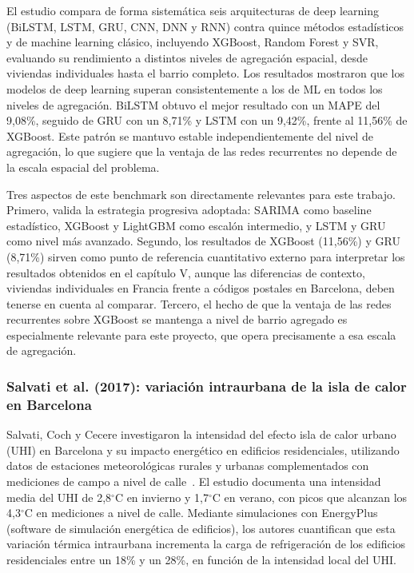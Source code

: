 \documentclass[12pt, a4paper]{article}
\begin{document}
El estudio compara de forma sistemática seis arquitecturas de deep learning (BiLSTM, LSTM, GRU, CNN, DNN y RNN) contra quince métodos estadísticos y de machine learning clásico, incluyendo XGBoost, Random Forest y SVR, evaluando su rendimiento a distintos niveles de agregación espacial, desde viviendas individuales hasta el barrio completo. Los resultados mostraron que los modelos de deep learning superan consistentemente a los de ML en todos los niveles de agregación. BiLSTM obtuvo el mejor resultado con un MAPE del 9,08\%, seguido de GRU con un 8,71\% y LSTM con un 9,42\%, frente al 11,56\% de XGBoost. Este patrón se mantuvo estable independientemente del nivel de agregación, lo que sugiere que la ventaja de las redes recurrentes no depende de la escala espacial del problema.

Tres aspectos de este benchmark son directamente relevantes para este trabajo. Primero, valida la estrategia progresiva adoptada: SARIMA como baseline estadístico, XGBoost y LightGBM como escalón intermedio, y LSTM y GRU como nivel más avanzado. Segundo, los resultados de XGBoost (11,56\%) y GRU (8,71\%) sirven como punto de referencia cuantitativo externo para interpretar los resultados obtenidos en el capítulo V, aunque las diferencias de contexto, viviendas individuales en Francia frente a códigos postales en Barcelona, deben tenerse en cuenta al comparar. Tercero, el hecho de que la ventaja de las redes recurrentes sobre XGBoost se mantenga a nivel de barrio agregado es especialmente relevante para este proyecto, que opera precisamente a esa escala de agregación.

\subsubsection{Salvati et al. (2017): variación intraurbana de la isla de calor en Barcelona}


Salvati, Coch y Cecere investigaron la intensidad del efecto isla de calor urbano (UHI) en Barcelona y su impacto energético en edificios residenciales, utilizando datos de estaciones meteorológicas rurales y urbanas complementados con mediciones de campo a nivel de calle~\cite{salvati2017}. El estudio documenta una intensidad media del UHI de 2,8$^\circ$C en invierno y 1,7$^\circ$C en verano, con picos que alcanzan los 4,3$^\circ$C en mediciones a nivel de calle. Mediante simulaciones con EnergyPlus (software de simulación energética de edificios), los autores cuantifican que esta variación térmica intraurbana incrementa la carga de refrigeración de los edificios residenciales entre un 18\% y un 28\%, en función de la intensidad local del UHI.
\end{document}
